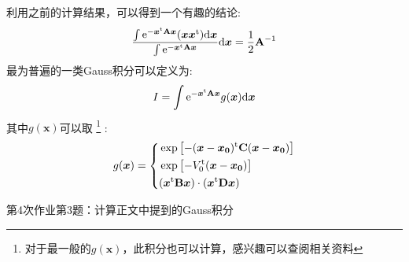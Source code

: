         利用之前的计算结果，可以得到一个有趣的结论:
        \begin{equation}
            \frac{\int\mathrm{e}^{-\bm{x}^{\mathrm{t}}\mathbf{A}\bm{x}}(\bm{x}\bm{x}^{\mathrm{t}})\mathrm{d} \bm{x}}{\int\mathrm{e}^{-\bm{x}^{\mathrm{t}}\mathbf{A}\bm{x}}}\mathrm{d} \bm{x}
            = \frac{1}{2}\mathbf{A}^{-1}
        \end{equation}
        最为普遍的一类Gauss积分可以定义为:
        \begin{equation}
            I = \int\mathrm{e}^{-\bm{x}^{\mathrm{t}}\mathbf{A}\bm{x}}g(\bm{x})\mathrm{d} \bm{x}
        \end{equation}
        其中$g(\bm{x})$可以取
        \footnote{对于最一般的$g(\bm{x})$，此积分也可以计算，感兴趣可以查阅相关资料}
        :
        \begin{equation}
            g(\bm{x}) = 
            \left\{
            \begin{split}
                    &\exp\left[-(\bm{x} - \bm{x_0})^{\mathrm{t}}\mathbf{C}(\bm{x} - \bm{x_0})\right]\\
                    &\exp\left[-V_0^{\mathrm{t}}(\bm{x} - \bm{x_0})\right]\\
                    &(\bm{x}^{\mathrm{t}}\mathbf{B}\bm{x})\cdot(\bm{x}^{\mathrm{t}}\mathbf{D}\bm{x})
            \end{split}
            \right.
        \end{equation}
        \begin{asg}
            第4次作业第3题：计算正文中提到的Gauss积分
        \end{asg}
        
        